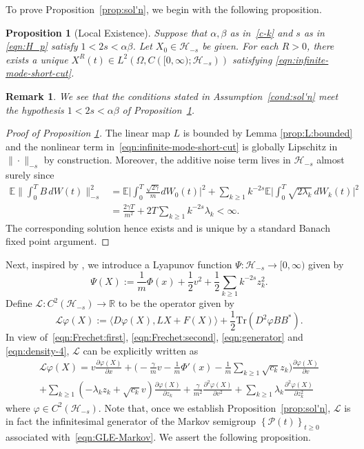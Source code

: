 \documentclass[11pt]{amsart}
\theoremstyle{definition}
\newcommand{\rbb}{\mathbb{R}}
\renewcommand{\L}{\mathcal{L}}
\renewcommand{\H}{\mathcal{H}}
\newcommand{\PMarkov}{\mathcal{P}}
\newcommand{\la}{\langle}
\newcommand{\ra}{\rangle}
\newcommand{\Tr}{\text{Tr}}
\newcommand{\f}{\varphi}
\newcommand{\Enone}[1]{\mathbb{E}#1}
\theoremstyle{definition}
\theoremstyle{plain}
\newtheorem{proposition}[theorem]{Proposition}
\newtheorem{remark}[theorem]{Remark}
\numberwithin{equation}{section}
\begin{document}
To prove Proposition~\ref{prop:sol'n}, we begin with the following proposition.  
\begin{proposition}[Local Existence] \label{prop:local-sol'n} Suppose that $\alpha, \beta$ as in~\eqref{c-k} and $s$ as in \eqref{eqn:H_p} satisfy $1< 2s<\alpha\beta$. Let $X_0\in\H_{-s}$ be given. For each $R>0$, there exists a unique $X^R(t)\in L^2\left(\Omega,C\left([0,\infty);\H_{-s}\right)\right)$ satisfying \eqref{eqn:infinite-mode-short-cut}. 
\end{proposition}
\begin{remark} We see that the conditions stated in Assumption~\ref{cond:sol'n} meet the hypothesis $1<2s<\alpha\beta$ of Proposition~\ref{prop:local-sol'n}.  
\end{remark}
\begin{proof}[Proof of Proposition \ref{prop:local-sol'n}]
The linear map $L$ is bounded by Lemma \ref{prop:L:bounded} and the nonlinear term in~\eqref{eqn:infinite-mode-short-cut} is globally Lipschitz in $\| \cdot \|_{-s}$ by construction. Moreover, the additive noise term lives in $\H_{-s}$ almost surely since
\begin{align*}
\Enone \Big\|\int_0^T\!\! B\, dW(t)\Big\|^2_{-s}& =\Enone\Big|\int_0^T\!\!\frac{\sqrt{2\gamma}}{m}dW_0(t)\Big|^2 + \sum_{k\geq 1}k^{-2s}\Enone\Big|\int_0^T\!\! \sqrt{2\lambda_k} \, dW_k(t)\Big|^2\\
&=\frac{2\gamma T}{m^2}+2T\sum_{k\geq 1}k^{-2s}\lambda_k<\infty.
\end{align*}
The corresponding solution hence exists and is unique by a standard Banach fixed point argument. 
\end{proof}
Next, inspired by \cite{mattingly2002ergodicity,pavliotis2014stochastic}, we introduce a Lyapunov function $\Psi:\H_{-s}\to[0,\infty)$ given by
\begin{equation} \label{eqn:Lyapunov}
\Psi(X):=\frac{1}{m}\Phi(x)+\frac{1}{2} v^2+\frac{1}{2}\sum_{k \geq 1}k^{-2s}z_k^2.
\end{equation}
Define $\mathcal{L}:C^2(\H_{-s})\to\rbb$ to be the operator given by
\begin{equation*}
\L\f(X):= \la D\f(X),LX+F(X)\ra+\frac{1}{2}\Tr( D^2\f BB^*).
\end{equation*}
In view of~\eqref{eqn:Frechet:first}, \eqref{eqn:Frechet:second}, \eqref{eqn:generator} and \eqref{eqn:density-4}, $\L$ can be explicitly written as
 \begin{multline} \label{defn:Markov-gen}
\L\f(X) = v\frac{\partial\f(X)}{\partial x}+\Big(\!\!-\frac{\gamma}{m}v-\frac{1}{m}\Phi'(x)-\frac{1}{m}\sum_{k\geq 1}\sqrt{c_k}z_k\Big)\frac{\partial\f(X)}{\partial v}\\
+\sum_{k\geq 1} \left(-\lambda_kz_k+\sqrt{c_k}v\right)\frac{\partial\f(X)}{\partial z_k}+ \frac{\gamma}{m^2}\frac{\partial ^2\f(X)}{\partial v^2}+\sum_{k\geq 1}\lambda_k\frac{\partial ^2\f(X)}{\partial z_k^2}
\end{multline}
where $\varphi\in C^2(\H_{-s})$. Note that, once we establish Proposition~\ref{prop:sol'n}, $\L$ is in fact the infinitesimal generator of the Markov semigroup $\left\{\PMarkov(t)\right\}_{t \geq 0}$ associated with~\eqref{eqn:GLE-Markov}. We assert the following proposition.
\end{document}
